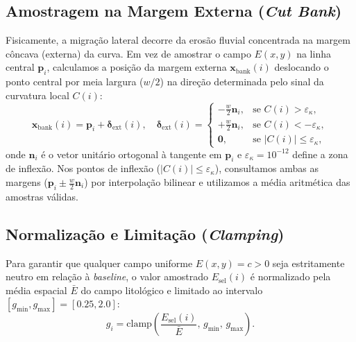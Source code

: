 \documentclass[10pt,twocolumn,a4paper]{article}
\begin{document}
\subsection{Amostragem na Margem Externa (\textit{Cut Bank})}
Fisicamente, a migração lateral decorre da erosão fluvial concentrada na margem côncava (externa) da curva. Em vez de amostrar o campo $E(x,y)$ na linha central $\mathbf{p}_i$, calculamos a posição da margem externa $\mathbf{x}_{\text{bank}}(i)$ deslocando o ponto central por meia largura ($w/2$) na direção determinada pelo sinal da curvatura local $C(i)$:
\begin{equation}
    \mathbf{x}_{\text{bank}}(i) = \mathbf{p}_i + \boldsymbol{\delta}_{\text{ext}}(i), \quad
    \boldsymbol{\delta}_{\text{ext}}(i) =
    \begin{cases}
        -\frac{w}{2} \mathbf{n}_i, & \text{se } C(i) > \varepsilon_\kappa, \\
        +\frac{w}{2} \mathbf{n}_i, & \text{se } C(i) < -\varepsilon_\kappa, \\
        \mathbf{0}, & \text{se } |C(i)| \le \varepsilon_\kappa,
    \end{cases}
    \label{eq:cut_bank_offset}
\end{equation}
onde $\mathbf{n}_i$ é o vetor unitário ortogonal à tangente em $\mathbf{p}_i$ e $\varepsilon_\kappa = 10^{-12}$ define a zona de inflexão. Nos pontos de inflexão ($|C(i)| \le \varepsilon_\kappa$), consultamos ambas as margens ($\mathbf{p}_i \pm \frac{w}{2}\mathbf{n}_i$) por interpolação bilinear e utilizamos a média aritmética das amostras válidas.

\subsection{Normalização e Limitação (\textit{Clamping})}
Para garantir que qualquer campo uniforme $E(x,y) = c > 0$ seja estritamente neutro em relação à \textit{baseline}, o valor amostrado $E_{\text{sel}}(i)$ é normalizado pela média espacial $\bar{E}$ do campo litológico e limitado ao intervalo $[g_{\min}, g_{\max}] = [0.25, 2.0]$:
\begin{equation}
    g_i = \text{clamp}\left( \frac{E_{\text{sel}}(i)}{\bar{E}}, \, g_{\min}, \, g_{\max} \right).
    \label{eq:mobility_factor}
\end{equation}
\end{document}
